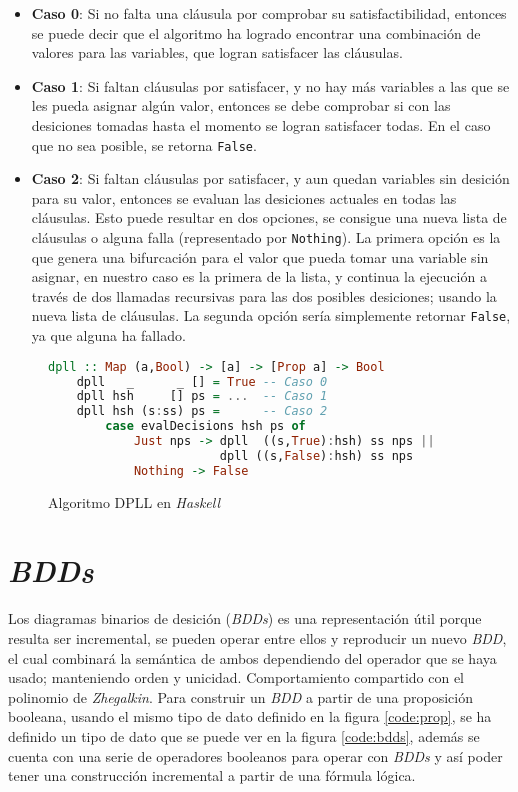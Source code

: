 \begin{itemize}
    \item \textbf{Caso 0}: Si no falta una cláusula por comprobar su satisfactibilidad, entonces se puede decir que el algoritmo ha logrado encontrar una combinación de valores para las variables, que logran satisfacer las cláusulas.
    \item \textbf{Caso 1}: Si faltan cláusulas por satisfacer, y no hay más variables a las que se les pueda asignar algún valor, entonces se debe comprobar si con las desiciones tomadas hasta el momento se logran satisfacer todas. En el caso que no sea posible, se retorna \texttt{False}.
    \item \textbf{Caso 2}: Si faltan cláusulas por satisfacer, y aun quedan variables sin desición para su valor, entonces se evaluan las desiciones actuales en todas las cláusulas. Esto puede resultar en dos opciones, se consigue una nueva lista de cláusulas o alguna falla (representado por \texttt{Nothing}). La primera opción es la que genera una bifurcación para el valor que pueda tomar una variable sin asignar, en nuestro caso es la primera de la lista, y continua la ejecución a través de dos llamadas recursivas para las dos posibles desiciones; usando la nueva lista de cláusulas. La segunda opción sería simplemente retornar \texttt{False}, ya que alguna ha fallado.
\end{itemize}

\begin{figure}
\begin{lstlisting}[language=Haskell]
    dpll :: Map (a,Bool) -> [a] -> [Prop a] -> Bool
    dpll   _      _ [] = True -- Caso 0
    dpll hsh     [] ps = ...  -- Caso 1
    dpll hsh (s:ss) ps =      -- Caso 2
        case evalDecisions hsh ps of
            Just nps -> dpll  ((s,True):hsh) ss nps ||
                        dpll ((s,False):hsh) ss nps
            Nothing -> False
\end{lstlisting}
\caption{Algoritmo DPLL en \textit{Haskell}}
\label{code:dpll}
\end{figure}

\section{\textit{BDDs}}

Los diagramas binarios de desición (\textit{BDDs}) es una representación útil porque resulta ser incremental, se pueden operar entre ellos y reproducir un nuevo \textit{BDD}, el cual combinará la semántica de ambos dependiendo del operador que se haya usado; manteniendo orden y unicidad. Comportamiento compartido con el polinomio de \textit{Zhegalkin}. Para construir un \textit{BDD} a partir de una proposición booleana, usando el mismo tipo de dato definido en la figura \ref{code:prop}, se ha definido un tipo de dato que se puede ver en la figura \ref{code:bdds}, además se cuenta con una serie de operadores booleanos para operar con \textit{BDDs} y así poder tener una construcción incremental a partir de una fórmula lógica.

